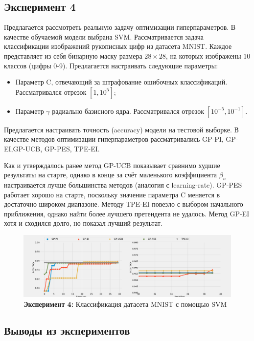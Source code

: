 \documentclass[12pt,fleqn]{article}
\begin{document}
	
	\newpage
	
	\subsection{Эксперимент 4}
	Предлагается рассмотреть реальную задачу оптимизации гиперпараметров. В качестве обучаемой модели выбрана SVM. Рассматривается задача классификации изображений рукописных цифр из датасета MNIST. Каждое представляет из себя бинарную маску размера $28\times28$, на которых изображены 10 классов (цифры 0-9). Предлагается настраивать следующие параметры:
	\begin{itemize}
		\item Параметр C, отвечающий за штрафование ошибочных классификаций. Рассматривался отрезок $[1, 10^5]$;
		\item Параметр $\gamma$ радиально базисного ядра. Рассматривался отрезок $[10^{-5}, 10^{-1}]$.
	\end{itemize}
	Предлагается настраивать точность (accuracy) модели на тестовой выборке. В качестве методов оптимизации гиперпараметров рассматривались GP-PI, \mbox{GP-EI},\mbox{GP-UCB}, GP-PES, TPE-EI.
	
	Как и утверждалось ранее метод GP-UCB показывает сравнимо худшие результаты на старте, однако в конце за счёт маленького коэффициента $\beta_n$ настраивается лучше большинства методов (аналогия с learning-rate). GP-PES работает хорошо на старте, поскольку значение параметра C меняется в достаточно широком диапазоне. Методу TPE-EI повезло с выбором начального приближения, однако найти более лучшего претендента не удалось. Метод GP-EI хотя и сходился долго, но показал лучший результат.  
	
	\begin{figure}[h]
		\includegraphics[scale=0.4,center]{../code/exp4/svm.pdf}
		\caption{\textbf{Эксперимент 4:} Классификация датасета MNIST с помощью SVM}
		\label{fig:exp4_svm}
	\end{figure}
	
	\subsection{Выводы из экспериментов}
	
\end{document}
